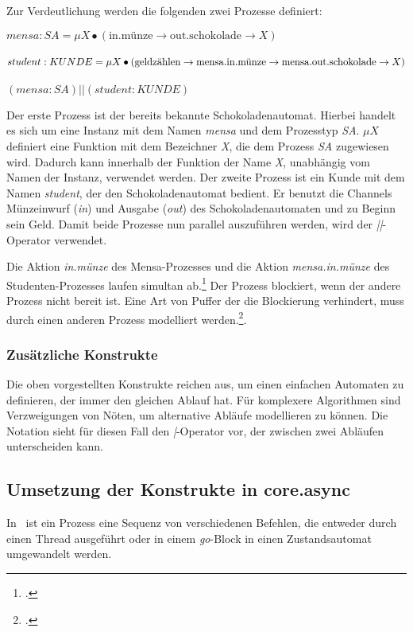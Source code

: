 Zur Verdeutlichung werden die folgenden zwei Prozesse definiert:

\begin{addmargin}[1cm]{0cm}
$mensa:SA = \mu X \bullet (\text{in.münze} \rightarrow \text{out.schokolade} \rightarrow X)$\\\\
$student:KUNDE = \mu X \bullet (\text{geldzählen} \rightarrow \text{mensa.in.münze} \rightarrow \\ \text{mensa.out.schokolade} \rightarrow  X)$\\\\
$ (mensa:SA) || (student:KUNDE) $
\end{addmargin}

Der erste Prozess ist der bereits bekannte Schokoladenautomat. Hierbei handelt es sich um eine Instanz mit dem Namen \textit{mensa} und dem Prozesstyp \textit{SA}. $\mu X$ definiert eine Funktion mit dem Bezeichner \textit{X}, die dem Prozess \textit{SA} zugewiesen wird. Dadurch kann innerhalb der Funktion der Name \textit{X}, unabhängig vom Namen der Instanz,  verwendet werden. Der zweite Prozess ist ein Kunde mit dem Namen \textit{student}, der den Schokoladenautomat bedient. Er benutzt die Channels Münzeinwurf (\textit{in}) und Ausgabe (\textit{out}) des Schokoladenautomaten und zu Beginn sein Geld. Damit beide Prozesse nun parallel auszuführen werden, wird der \textit{||}-Operator verwendet.

Die Aktion \textit{in.münze} des Mensa-Prozesses und die Aktion \textit{mensa.in.münze} des Studenten-Prozesses laufen simultan ab.\footcite[vgl][Seite 117]{CSPBOOK} Der Prozess blockiert, wenn der andere Prozess nicht bereit ist. Eine Art von Puffer der die Blockierung verhindert, muss durch einen anderen Prozess modelliert werden.\footcite[vgl.][Seite 133]{CSPBOOK}.

\subsubsection{Zusätzliche Konstrukte}
Die oben vorgestellten Konstrukte reichen aus, um einen einfachen Automaten zu definieren, der immer den gleichen Ablauf hat. Für komplexere Algorithmen sind Verzweigungen von Nöten, um alternative Abläufe modellieren zu können. Die Notation sieht für diesen Fall den \textit{|}-Operator vor, der zwischen zwei Abläufen unterscheiden kann.

\subsection{Umsetzung der Konstrukte in core.async}
In \CA\ ist ein Prozess eine Sequenz von verschiedenen Befehlen, die entweder durch einen Thread ausgeführt oder in einem \textit{go}-Block in einen Zustandsautomat umgewandelt werden.

